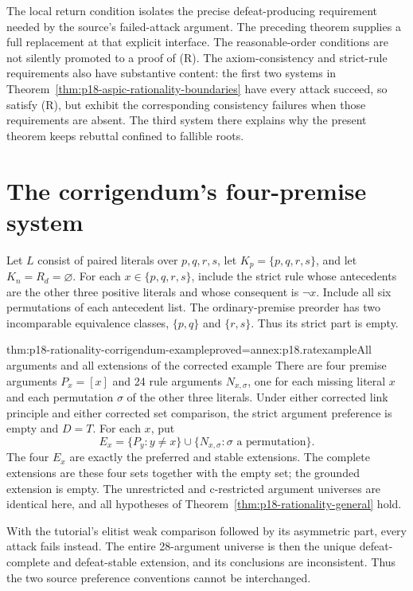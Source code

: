 The local return condition isolates the precise defeat-producing
requirement needed by the source's failed-attack argument.
The preceding theorem supplies a full replacement at that explicit
interface. The reasonable-order conditions are not silently promoted
to a proof of (R).
The axiom-consistency and strict-rule requirements also have substantive
content: the first two systems in
Theorem~\ref{thm:p18-aspic-rationality-boundaries} have every attack
succeed, so satisfy (R), but exhibit the corresponding consistency
failures when those requirements are absent. The third system there
explains why the present theorem keeps rebuttal confined to fallible
roots.

\section{The corrigendum's four-premise system}

Let \(L\) consist of paired literals over \(p,q,r,s\), let
\(K_p=\{p,q,r,s\}\), and let \(K_n=R_d=\varnothing\).
For each \(x\in\{p,q,r,s\}\), include the strict rule whose antecedents
are the other three positive literals and whose consequent is \(\neg x\).
Include all six permutations of each antecedent list.
The ordinary-premise preorder has two incomparable equivalence classes,
\(\{p,q\}\) and \(\{r,s\}\). Thus its strict part is empty.

\begin{hbtheorem}{thm:p18-rationality-corrigendum-example}{proved=annex:p18.ratexample}{All arguments and all extensions of the corrected example}
There are four premise arguments \(P_x=[x]\) and 24 rule arguments
\(N_{x,\sigma}\), one for each missing literal \(x\) and each permutation
\(\sigma\) of the other three literals.
Under either corrected link principle and either corrected set comparison,
the strict argument preference is empty and \(D=T\).
For each \(x\), put
\[
 E_x=\{P_y:y\ne x\}\cup\{N_{x,\sigma}:\sigma\text{ a permutation}\}.
\]
The four \(E_x\) are exactly the preferred and stable extensions.
The complete extensions are these four sets together with the empty set;
the grounded extension is empty.
The unrestricted and c-restricted argument universes are identical here,
and all hypotheses of Theorem~\ref{thm:p18-rationality-general} hold.

With the tutorial's elitist weak comparison followed by its asymmetric
part, every attack fails instead. The entire 28-argument universe is then
the unique defeat-complete and defeat-stable extension, and its conclusions
are inconsistent. Thus the two source preference conventions cannot be
interchanged.
\end{hbtheorem}


